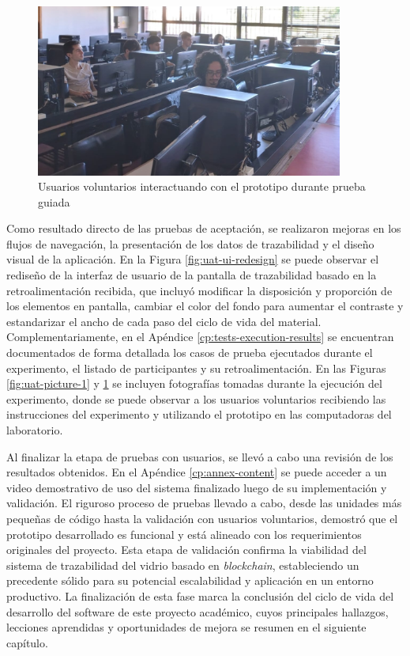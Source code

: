 \begin{figure}[!tb]
\centering
\includegraphics[width=0.9\textwidth]{Figures/uat-2.jpg}
\caption{Usuarios voluntarios interactuando con el prototipo durante prueba guiada}
\label{fig:uat-picture-2}
\end{figure}

Como resultado directo de las pruebas de aceptación, se realizaron mejoras en los flujos de navegación, la presentación de los datos de \gls{trazabilidad} y el diseño visual de la aplicación. En la Figura \ref{fig:uat-ui-redesign} se puede observar el rediseño de la interfaz de usuario de la pantalla de trazabilidad basado en la retroalimentación recibida, que incluyó modificar la disposición y proporción de los elementos en pantalla, cambiar el color del fondo para aumentar el contraste y estandarizar el ancho de cada paso del ciclo de vida del material. Complementariamente, en el Apéndice \ref{cp:tests-execution-results} se encuentran documentados de forma detallada los casos de prueba ejecutados durante el experimento, el listado de participantes y su retroalimentación. En las Figuras \ref{fig:uat-picture-1} y \ref{fig:uat-picture-2} se incluyen fotografías tomadas durante la ejecución del experimento, donde se puede observar a los usuarios voluntarios recibiendo las instrucciones del experimento y utilizando el prototipo en las computadoras del laboratorio.

Al finalizar la etapa de pruebas con usuarios, se llevó a cabo una revisión de los resultados obtenidos. En el Apéndice \ref{cp:annex-content} se puede acceder a un video demostrativo de uso del sistema finalizado luego de su implementación y validación. El riguroso proceso de pruebas llevado a cabo, desde las unidades más pequeñas de código hasta la validación con usuarios voluntarios, demostró que el prototipo desarrollado es funcional y está alineado con los requerimientos originales del proyecto. Esta etapa de validación confirma la viabilidad del sistema de trazabilidad del vidrio basado en \textit{blockchain}, estableciendo un precedente sólido para su potencial escalabilidad y aplicación en un entorno productivo. La finalización de esta fase marca la conclusión del ciclo de vida del desarrollo del software de este proyecto académico, cuyos principales hallazgos, lecciones aprendidas y oportunidades de mejora se resumen en el siguiente capítulo.
